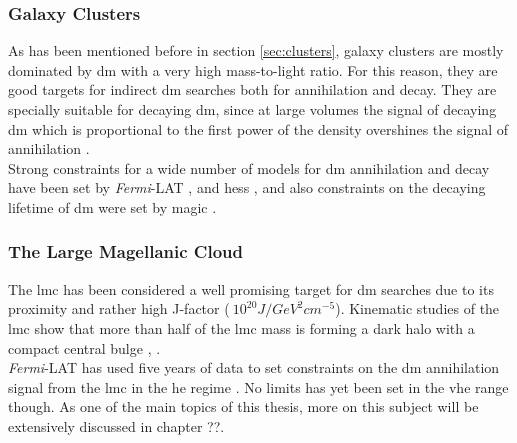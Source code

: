 \documentclass[main.tex]{subfiles}
\begin{document}
\subsubsection{Galaxy Clusters}

As has been mentioned before in section \ref{sec:clusters}, galaxy clusters are mostly dominated by \gls{dm} with a very high mass-to-light ratio. For this reason, they are good targets for indirect \gls{dm}  searches both for annihilation and decay. They are specially suitable for decaying \gls{dm}, since at large volumes the signal of decaying \gls{dm} which is proportional to the first power of the density overshines the signal of annihilation \cite{2012DecayingDMCirelli}.\\
Strong constraints for a wide number of models for \gls{dm} annihilation and decay have been set by \textit{Fermi}-LAT \cite{2012DMClustersDecayFermi}, \cite{2010DMClustersFermiAnnihilation} and \gls{hess} \cite{2012DMClustersHess}, and also constraints on the decaying lifetime of \gls{dm} were set by \gls{magic} \cite{2018DMClustersMAGIC}. 

\subsubsection{The Large Magellanic Cloud}

The \gls{lmc} has been considered a well promising target for \gls{dm} searches due to its proximity and rather high J-factor ($~10^{20} J/GeV^{2}cm^{-5}$). Kinematic studies of the \gls{lmc} show that more than half of the \gls{lmc} mass is forming a dark halo with a compact central bulge \cite{2006LMCkinematics}, \cite{1999LMCcentralbulge}.\\
\textit{Fermi}-LAT has used five years of data to set constraints on the \gls{dm} annihilation signal from the \gls{lmc} in the \gls{he} regime \cite{2015LMCDarkMatterFermi}. No limits has yet been set in the \gls{vhe} range though. 
As one of the main topics of this thesis, more on this subject will be extensively discussed in chapter ??.
\end{document}
